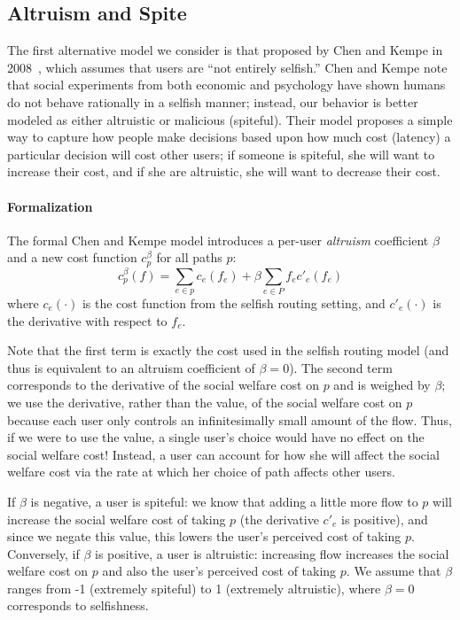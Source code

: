 \subsection{Altruism and Spite}
The first alternative model we consider is that proposed by Chen and Kempe in 2008~\cite{chen}, which assumes that users are ``not entirely selfish.''
Chen and Kempe note that social experiments from both economic and psychology have shown humans do not behave rationally in a selfish manner; instead, our behavior is better modeled as either altruistic or malicious (spiteful).
Their model proposes a simple way to capture how people make decisions based upon how much cost (latency) a particular decision will cost other users; if someone is spiteful, she will want to increase their cost, and if she are altruistic, she will want to decrease their cost.

\paragraph{Formalization}
The formal Chen and Kempe model introduces a per-user \emph{altruism} coefficient $\beta$ and a new cost function
$c^\beta_p$ for all paths $p$: 
$$c^\beta_p(f) = \sum_{e \in p} c_e(f_e) + \beta\sum_{e\in P} f_ec'_e(f_e)$$
where $c_e(\cdot)$ is the cost function from the selfish routing setting, and $c'_e(\cdot)$ is the derivative with respect to $f_e$.

Note that the first term is exactly the cost used in the selfish routing model (and thus is equivalent to an altruism coefficient of $\beta = 0$).
The second term corresponds to the derivative of the social welfare cost on $p$ and is weighed by $\beta$; we use the derivative, rather than the value, of the social welfare cost on $p$ because each user only controls an infinitesimally small amount of the flow. Thus, if we were to use the value, 
a single user's choice would have no effect on the social welfare cost! 
Instead, a user can account for how she will affect the social welfare cost via the rate at which her  choice of path affects other users.

If $\beta$ is negative, a user is spiteful: we know that adding a little more flow to $p$ will increase the social welfare cost of taking $p$ (the derivative $c'_e$ is positive), and since we negate this value, this lowers the user's perceived cost of taking $p$.
Conversely, if $\beta$ is positive, a user is altruistic: increasing flow increases the social welfare cost on $p$ and also the user's perceived cost of taking $p$.
We assume that $\beta$ ranges from -1 (extremely spiteful) to 1 (extremely altruistic), where $\beta=0$ corresponds to selfishness.

